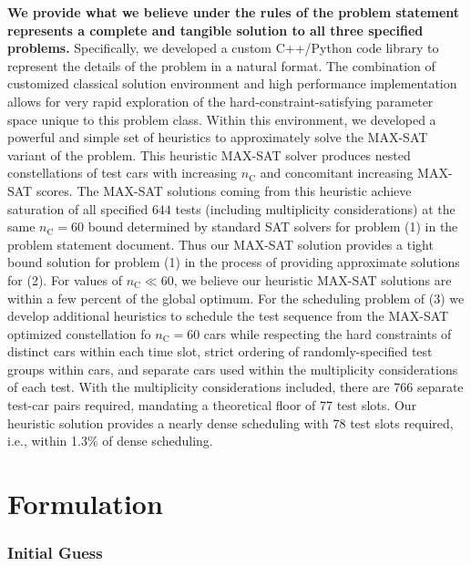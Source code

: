 \documentclass[aps,prl,twocolumn,superscriptaddress,groupedaddress]{revtex4}  %
\begin{document}
\textbf{We provide what we believe under the rules of the problem statement
represents a complete and tangible solution to all three specified problems.}
Specifically, we developed a custom C++/Python code library to represent the
details of the problem in a natural format. 
The combination of customized classical solution environment and high
performance implementation allows for very rapid exploration of the
hard-constraint-satisfying parameter space unique to this problem class.  Within
this environment, we developed a powerful and simple set of heuristics to
approximately solve the MAX-SAT variant of the problem. This heuristic MAX-SAT
solver produces nested constellations of test cars with increasing
$n_{\mathrm{C}}$ and concomitant increasing MAX-SAT scores. The MAX-SAT
solutions coming from this heuristic achieve saturation of all specified $644$
tests (including multiplicity considerations) at the same $n_{\mathrm{C}} = 60$
bound determined by standard SAT solvers for problem (1) in the problem
statement document. Thus our MAX-SAT solution provides a tight bound solution
for problem (1) in the process of providing approximate solutions for (2). For
values of $n_{\mathrm{C}} \ll 60$, we believe our heuristic MAX-SAT solutions
are within a few percent of the global optimum. For the scheduling problem of
(3) we develop additional heuristics to schedule the test sequence from the
MAX-SAT optimized constellation fo $n_{\mathrm{C}} = 60$ cars while respecting
the hard constraints of distinct cars within each time slot, strict ordering of
randomly-specified test groups within cars, and separate cars used within the
multiplicity considerations of each test. With the multiplicity considerations
included, there are 766 separate test-car pairs required, mandating a
theoretical floor of 77 test slots. Our heuristic solution provides a nearly
dense scheduling with 78 test slots required, i.e., within 1.3$\%$ of dense
scheduling.


\section{Formulation}

\subsubsection{Initial Guess}






% 
% 
\end{document}
